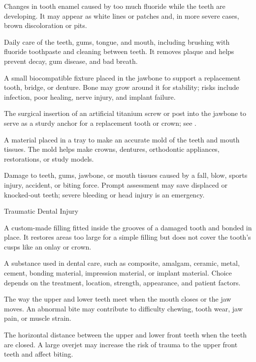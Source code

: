  Changes in tooth enamel caused by too much fluoride while the teeth are developing. It may appear as white lines or patches and, in more severe cases, brown discoloration or pits.

 Daily care of the teeth, gums, tongue, and mouth, including brushing with fluoride toothpaste and cleaning between teeth. It removes plaque and helps prevent decay, gum disease, and bad breath.

 A small biocompatible fixture placed in the jawbone to support a replacement tooth, bridge, or denture. Bone may grow around it for stability; risks include infection, poor healing, nerve injury, and implant failure.

 The surgical insertion of an artificial titanium screw or post into the jawbone to serve as a sturdy anchor for a replacement tooth or crown; see .

 A material placed in a tray to make an accurate mold of the teeth and mouth tissues. The mold helps make crowns, dentures, orthodontic appliances, restorations, or study models.

 Damage to teeth, gums, jawbone, or mouth tissues caused by a fall, blow, sports injury, accident, or biting force. Prompt assessment may save displaced or knocked-out teeth; severe bleeding or head injury is an emergency.

\synonyms
Traumatic Dental Injury

 A custom-made filling fitted inside the grooves of a damaged tooth and bonded in place. It restores areas too large for a simple filling but does not cover the tooth’s cusps like an onlay or crown.

 A substance used in dental care, such as composite, amalgam, ceramic, metal, cement, bonding material, impression material, or implant material. Choice depends on the treatment, location, strength, appearance, and patient factors.

 The way the upper and lower teeth meet when the mouth closes or the jaw moves. An abnormal bite may contribute to difficulty chewing, tooth wear, jaw pain, or muscle strain.

 The horizontal distance between the upper and lower front teeth when the teeth are closed. A large overjet may increase the risk of trauma to the upper front teeth and affect biting.


